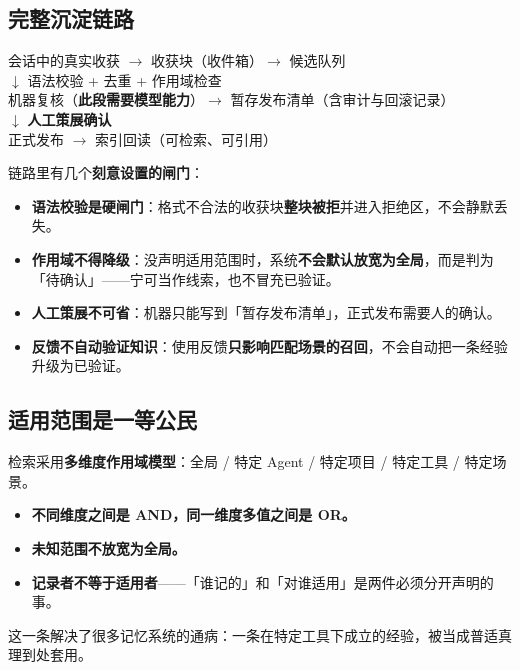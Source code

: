 \documentclass[11pt,a4paper]{ctexart}
\newcommand{\keybox}[1]{%
  \begin{center}%
  \begin{minipage}{0.94\linewidth}%
  \setlength{\fboxsep}{9pt}%
  \colorbox{SoftGray}{\parbox{\dimexpr\linewidth-2\fboxsep}{#1}}%
  \end{minipage}%
  \end{center}%
}
\begin{document}
\subsection{完整沉淀链路}

\keybox{\centering\small
会话中的真实收获 $\rightarrow$ 收获块（收件箱）$\rightarrow$ 候选队列\\[0.35em]
$\downarrow$ 语法校验 + 去重 + 作用域检查\\[0.35em]
机器复核（\textbf{此段需要模型能力}）$\rightarrow$ 暂存发布清单（含审计与回滚记录）\\[0.35em]
$\downarrow$ \textbf{人工策展确认}\\[0.35em]
正式发布 $\rightarrow$ 索引回读（可检索、可引用）}

链路里有几个\textbf{刻意设置的闸门}：

\begin{itemize}
  \item \textbf{语法校验是硬闸门}：格式不合法的收获块\textbf{整块被拒}并进入拒绝区，不会静默丢失。
  \item \textbf{作用域不得降级}：没声明适用范围时，系统\textbf{不会默认放宽为全局}，而是判为「待确认」——宁可当作线索，也不冒充已验证。
  \item \textbf{人工策展不可省}：机器只能写到「暂存发布清单」，正式发布需要人的确认。
  \item \textbf{反馈不自动验证知识}：使用反馈\textbf{只影响匹配场景的召回}，不会自动把一条经验升级为已验证。
\end{itemize}

\subsection{适用范围是一等公民}

检索采用\textbf{多维度作用域模型}：全局 / 特定 Agent / 特定项目 / 特定工具 / 特定场景。

\begin{itemize}
  \item \textbf{不同维度之间是 AND，同一维度多值之间是 OR。}
  \item \textbf{未知范围不放宽为全局。}
  \item \textbf{记录者不等于适用者}——「谁记的」和「对谁适用」是两件必须分开声明的事。
\end{itemize}

这一条解决了很多记忆系统的通病：一条在特定工具下成立的经验，被当成普适真理到处套用。

\end{document}
